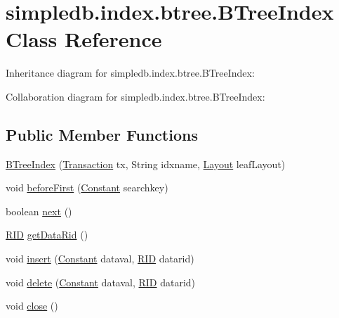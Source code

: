\hypertarget{classsimpledb_1_1index_1_1btree_1_1BTreeIndex}{}\section{simpledb.\+index.\+btree.\+B\+Tree\+Index Class Reference}
\label{classsimpledb_1_1index_1_1btree_1_1BTreeIndex}


Inheritance diagram for simpledb.\+index.\+btree.\+B\+Tree\+Index\+:


Collaboration diagram for simpledb.\+index.\+btree.\+B\+Tree\+Index\+:
\subsection*{Public Member Functions}
\begin{DoxyCompactItemize}
\item 
\hyperlink{classsimpledb_1_1index_1_1btree_1_1BTreeIndex_aac787bcc64a65ba8983a513e6b7f9719}{B\+Tree\+Index} (\hyperlink{classsimpledb_1_1tx_1_1Transaction}{Transaction} tx, String idxname, \hyperlink{classsimpledb_1_1record_1_1Layout}{Layout} leaf\+Layout)
\item 
void \hyperlink{classsimpledb_1_1index_1_1btree_1_1BTreeIndex_adaca869455d2d631df38e7bc81de2420}{before\+First} (\hyperlink{classsimpledb_1_1query_1_1Constant}{Constant} searchkey)
\item 
boolean \hyperlink{classsimpledb_1_1index_1_1btree_1_1BTreeIndex_aa2629b173455d96fde28353e150da4f0}{next} ()
\item 
\hyperlink{classsimpledb_1_1record_1_1RID}{R\+ID} \hyperlink{classsimpledb_1_1index_1_1btree_1_1BTreeIndex_a842091f8c02f9d3009f634c5c0635b4f}{get\+Data\+Rid} ()
\item 
void \hyperlink{classsimpledb_1_1index_1_1btree_1_1BTreeIndex_a74ac0fcec24483159ab82ac47d7bc790}{insert} (\hyperlink{classsimpledb_1_1query_1_1Constant}{Constant} dataval, \hyperlink{classsimpledb_1_1record_1_1RID}{R\+ID} datarid)
\item 
void \hyperlink{classsimpledb_1_1index_1_1btree_1_1BTreeIndex_ae7be53ba321674d7300c2c67376a9859}{delete} (\hyperlink{classsimpledb_1_1query_1_1Constant}{Constant} dataval, \hyperlink{classsimpledb_1_1record_1_1RID}{R\+ID} datarid)
\item 
void \hyperlink{classsimpledb_1_1index_1_1btree_1_1BTreeIndex_a057aed52a768423734720f07bf0db94b}{close} ()
\end{DoxyCompactItemize}
